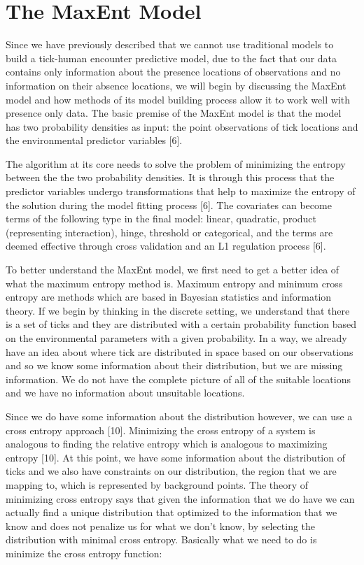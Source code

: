\section{The MaxEnt Model}
Since we have previously described that we cannot use traditional models to build a tick-human encounter predictive model, due to the fact that our data contains only information about the presence locations of observations and no information on their absence locations, we will begin by discussing the MaxEnt model and how methods of its model building process allow it to work well with presence only data. The basic premise of the MaxEnt model is that the model has two probability densities as input: the point observations of tick locations and the environmental predictor variables [6]. \newline

\noindent The algorithm at its core needs to solve the problem of minimizing the entropy between the the two probability densities. It is through this process that the predictor variables undergo transformations that help to maximize the entropy of the solution during the model fitting process [6]. The covariates can become terms of the following type in the final model: linear, quadratic, product (representing interaction), hinge, threshold or categorical, and the terms are deemed effective through cross validation and an L1 regulation process [6].  \newline

\noindent To better understand the MaxEnt model, we first need to get a better idea of what the maximum entropy method is. Maximum entropy and minimum cross entropy are methods which are based in Bayesian statistics and information theory. If we begin by thinking in the discrete setting, we understand that there is a set of ticks and they are distributed with a certain probability function based on the environmental parameters with a given probability. In a way, we already have an idea about where tick are distributed in space based on our observations and so we know some information about their distribution, but we are missing information. We do not have the complete picture of all of the suitable locations and we have no information about unsuitable locations. \newline

\noindent Since we do have some information about the distribution however, we can use a cross entropy approach [10]. Minimizing the cross entropy of a system is analogous to finding the relative entropy which is analogous to maximizing entropy [10].   At this point, we have some information about the distribution of ticks and we also have constraints on our distribution, the region that we are mapping to, which is represented by background points. The theory of minimizing cross entropy says that given the information that we do have we can actually find a unique distribution that optimized to the information that we know and does not penalize us for what we don't know, by selecting the distribution with minimal cross entropy. Basically what we need to do is minimize the cross entropy function:  \newline

